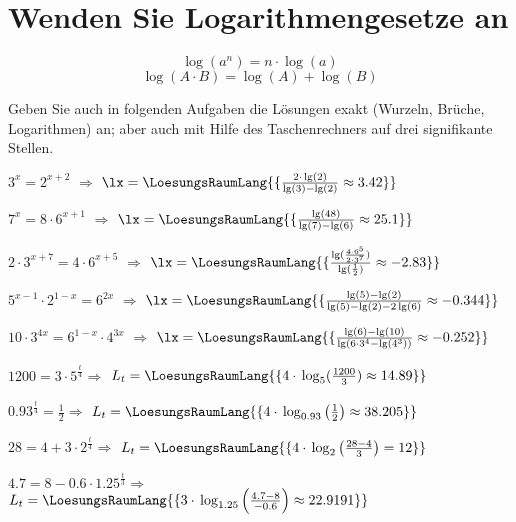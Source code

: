 \section{Wenden Sie Logarithmengesetze an}

$$\log(a^n) = n\cdot{}\log(a)$$
$$\log(A\cdot{}B) = \log(A) + \log(B)$$

Geben Sie auch in folgenden Aufgaben die Lösungen exakt (Wurzeln,
Brüche, Logarithmen) an; aber auch mit Hilfe des Taschenrechners auf drei
signifikante Stellen.

\begin{bbwAufgabenBlock}
\item $3^x=2^{x+2}$ $\Longrightarrow$ $\lx=\LoesungsRaumLang{\{\frac{2\cdot{}\lg(2)}{\lg(3)-\lg(2)} \approx  3.42  \}}$ \plz{}
\item $7^x=8\cdot{}6^{x+1}$ $\Longrightarrow$ $\lx=\LoesungsRaumLang{\{\frac{\lg(48)}{\lg(7)-\lg(6)} \approx 25.1   \}}$ \plz{}
\item $2\cdot{}3^{x+7}=4\cdot{}6^{x+5}$ $\Longrightarrow$ $\lx=\LoesungsRaumLang{\{\frac{\lg(\frac{4\cdot{}6^5}{2\cdot{}3^7})}{\lg(\frac12)} \approx  -2.83  \}}$ \plz{}
\item $5^{x-1}\cdot{}2^{1-x}=6^{2x}$ $\Longrightarrow$ $\lx=\LoesungsRaumLang{\{\frac{\lg(5)-\lg(2)}{\lg(5)-\lg(2)-2\lg(6)} \approx -0.344   \}}$ \plz{}
\item $10\cdot{}3^{4x} = 6^{1-x}\cdot{}4^{3x}$ $\Longrightarrow$ $\lx=\LoesungsRaumLang{\{\frac{\lg(6)-\lg(10)}{\lg(6\cdot{}3^4 - \lg(4^3))} \approx -0.252   \}}$ \plz{}

\noTRAINER{\newpage}

\item $1200=3\cdot{} 5^{\frac{t}{4}} \Longrightarrow$ $L_t = \LoesungsRaumLang{\{ 4\cdot{}\log_5(\frac{1200}3)\approx 14.89   \}}$ \plz{}

\item $0.93^{\frac{t}4}=\frac12 \Longrightarrow$ $L_t
= \LoesungsRaumLang{\{
4\cdot{}\log_{0.93}\left(\frac12\right) \approx 38.205   \}}$ \plz{}

\item $28 = 4 + 3\cdot{} 2^\frac{t}{4} \Longrightarrow$ $L_t
= \LoesungsRaumLang{\{ 4\cdot{} \log_2\left(\frac{28-4}3\right) = 12 \}}$ \plz{}

\noTRAINER{\newpage}

\item $4.7 = 8 - 0.6\cdot{} 1.25^{\frac{t}{3}} \Longrightarrow$ $L_t
= \LoesungsRaumLang{\{
3\cdot{} \log_{1.25}\left(\frac{4.7-8}{-0.6}\right) \approx 22.9191  \}}$ \plz{}

\end{bbwAufgabenBlock}

